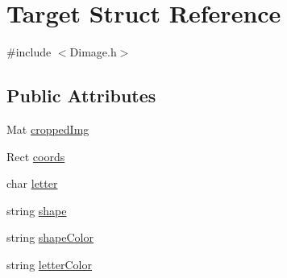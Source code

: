 \hypertarget{structTarget}{\section{Target Struct Reference}
\label{structTarget}
}


{\ttfamily \#include $<$Dimage.\-h$>$}

\subsection*{Public Attributes}
\begin{DoxyCompactItemize}
\item 
Mat \hyperlink{structTarget_ae37fee2ea260011ecacbfb0f23b3f9ab}{cropped\-Img}
\item 
Rect \hyperlink{structTarget_a7aeb05fae417de29ec649370007eba21}{coords}
\item 
char \hyperlink{structTarget_a489063b23f51649a9d16f988106021e3}{letter}
\item 
string \hyperlink{structTarget_adc3bbb55cca6bd906f5e8615a16d341e}{shape}
\item 
string \hyperlink{structTarget_a96b4e515aa265beb1996e430a4c5de07}{shape\-Color}
\item 
string \hyperlink{structTarget_acd28a79f6727170208e1a642e7471bc3}{letter\-Color}
\end{DoxyCompactItemize}


